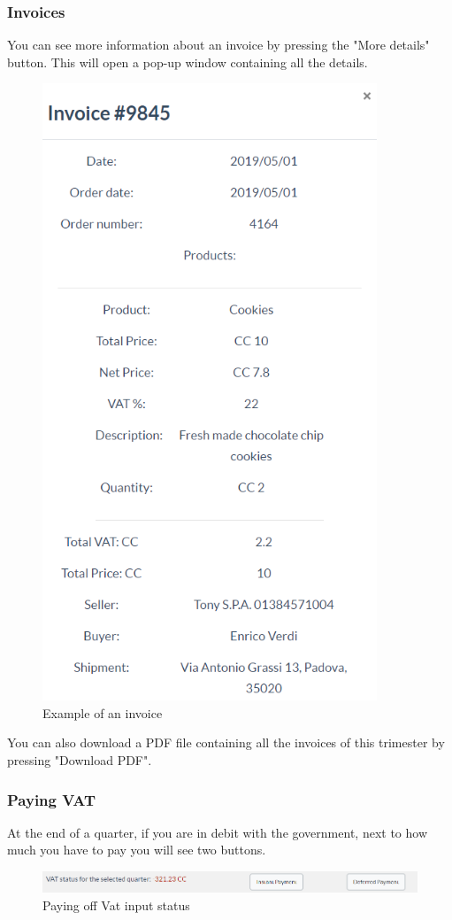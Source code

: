 		\subsubsection{Invoices}
		You can see more information about an invoice by pressing the 
		"More details" button. This will open a pop-up window containing all 
		the details.
		\begin{figure}[H]
			\includegraphics[width=10cm]{res/images/invoice_details.png}
			\centering
			\caption{Example of an invoice}
		\end{figure}
		\noindent You can also download a PDF file containing all the invoices 
		of this trimester by pressing "Download PDF". 
		\subsubsection{Paying VAT}
		At the end of a quarter, if you are in debit with the government, next 
		to how much you have to pay you will see two buttons.
		\begin{figure}[H]
			\includegraphics[width=15cm]{res/images/paying_vat.png}
			\centering
			\caption{Paying off Vat input status}
		\end{figure}
